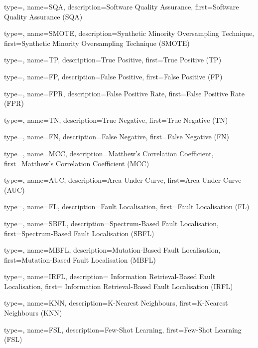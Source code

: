 {
	type=\acronymtype,
	name={SQA},
	description={Software Quality Assurance},
	first={Software Quality Assurance (SQA)}
}


{
	type=\acronymtype,
	name={SMOTE},
	description={Synthetic Minority Oversampling Technique},
	first={Synthetic Minority Oversampling Technique (SMOTE)}
}

{
	type=\acronymtype,
	name={TP},
	description={True Positive},
	first={True Positive (TP)}
}

{
	type=\acronymtype,
	name={FP},
	description={False Positive},
	first={False Positive (FP)}
}

{
	type=\acronymtype,
	name={FPR},
	description={False Positive Rate},
	first={False Positive Rate (FPR)}
}

{
	type=\acronymtype,
	name={TN},
	description={True Negative},
	first={True Negative (TN)}
}

{
	type=\acronymtype,
	name={FN},
	description={False Negative},
	first={False Negative (FN)}
}

{
	type=\acronymtype,
	name={MCC},
	description={Matthew's Correlation Coefficient},
	first={Matthew's Correlation Coefficient (MCC)}
}

{
	type=\acronymtype,
	name={AUC},
	description={Area Under Curve},
	first={Area Under Curve (AUC)}
}

{
	type=\acronymtype,
	name={FL},
	description={Fault Localisation},
	first={Fault Localisation (FL)}
}

{
	type=\acronymtype,
	name={SBFL},
	description={Spectrum-Based Fault Localisation},
	first={Spectrum-Based Fault Localisation (SBFL)}
}

{
	type=\acronymtype,
	name={MBFL},
	description={Mutation-Based Fault Localisation},
	first={Mutation-Based Fault Localisation (MBFL)}
}

{
	type=\acronymtype,
	name={IRFL},
	description={ Information Retrieval-Based Fault Localisation},
	first={ Information Retrieval-Based Fault Localisation (IRFL)}
}

{
	type=\acronymtype,
	name={KNN},
	description={K-Nearest Neighbours},
	first={K-Nearest Neighbours (KNN)}
}

{
	type=\acronymtype,
	name={FSL},
	description={Few-Shot Learning},
	first={Few-Shot Learning (FSL)}
}

